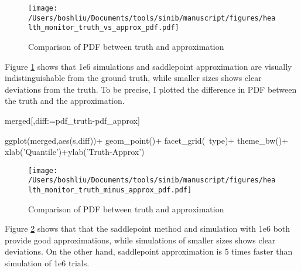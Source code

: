 
\begin{figure}[h]
\texttt{[image: /Users/boshliu/Documents/tools/sinib/manuscript/figures/health\_monitor\_truth\_vs\_approx\_pdf.pdf]}
\caption{Comparison of PDF between truth and approximation}
\label{fig:5}
\end{figure}

Figure \ref{fig:5} shows that 1e6 simulations and saddlepoint approximation are visually indistinguishable from the ground truth, while smaller sizes shows clear deviations from the truth. To be precise, I plotted the difference in PDF between the truth and the approximation.

\begin{example}
merged[,diff:=pdf_truth-pdf_approx]

ggplot(merged,aes(s,diff))+
	geom_point()+
	facet_grid(~type)+
	theme_bw()+
	xlab('Quantile')+ylab('Truth-Approx')
\end{example}

\begin{figure}[h]
\texttt{[image: /Users/boshliu/Documents/tools/sinib/manuscript/figures/health\_monitor\_truth\_minus\_approx\_pdf.pdf]}
\caption{Comparison of PDF between truth and approximation}
\label{fig:6}
\end{figure}

Figure \ref{fig:6} shows that that the saddlepoint method and simulation with 1e6 both provide good approximations, while simulations of smaller sizes shows clear deviations. On the other hand, saddlepoint approximation is 5 times faster than simulation of 1e6 trials.

